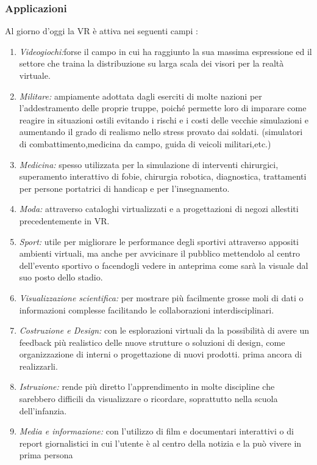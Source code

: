 \subsubsection{Applicazioni }
Al giorno d'oggi la VR è attiva nei seguenti campi \cite{VRApplications}:
\begin{enumerate}
	\item \textit{Videogiochi:}forse il campo in cui ha raggiunto la sua massima espressione ed il settore che traina la distribuzione su larga scala dei visori per la realtà virtuale.
	\item \textit{Militare:} ampiamente adottata dagli eserciti di molte nazioni per l'addestramento delle proprie truppe, poiché permette loro di imparare come reagire in situazioni ostili evitando i rischi e i costi delle vecchie simulazioni e aumentando il grado di realismo nello stress provato dai soldati. (simulatori di combattimento,medicina da campo, guida di veicoli militari,etc.)
	\item \textit{Medicina:} spesso utilizzata per la simulazione di interventi chirurgici, superamento interattivo di fobie, chirurgia robotica, diagnostica, trattamenti per persone portatrici di handicap e per l'insegnamento.
	\item \textit{Moda:} attraverso cataloghi virtualizzati e a progettazioni di negozi allestiti precedentemente in VR.
	\item \textit{Sport:} utile per migliorare le performance degli sportivi attraverso appositi ambienti virtuali, ma anche per avvicinare il pubblico mettendolo al centro dell'evento sportivo o facendogli vedere in anteprima come sarà la visuale dal suo posto dello stadio.
	\item \textit{Visualizzazione scientifica:} per mostrare più facilmente grosse moli di dati o informazioni complesse facilitando le collaborazioni interdisciplinari.
	\item \textit{Costruzione e Design:} con le esplorazioni virtuali da la possibilità di avere un feedback più realistico delle nuove strutture o soluzioni di design, come organizzazione di interni o progettazione di nuovi prodotti. prima ancora di realizzarli.
	\item \textit{Istruzione:} rende più diretto l'apprendimento in molte discipline che sarebbero difficili da visualizzare o ricordare, soprattutto nella scuola dell'infanzia.
	\item \textit{Media e informazione:} con l'utilizzo di film e documentari interattivi o di report giornalistici in cui l'utente è al centro della notizia e la può vivere in prima persona
	
\end{enumerate}

